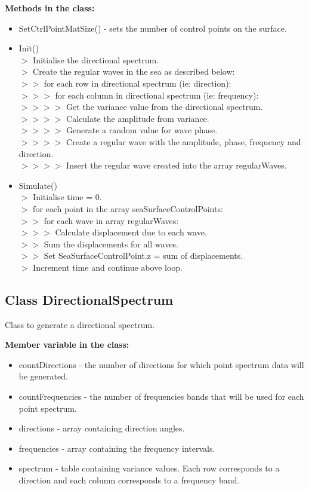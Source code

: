 \textbf{Methods in the class:}
\begin{itemize}
  \item SetCtrlPointMatSize() - sets the number of control points on the
    surface.
  \item Init()\\
    $>$ Initialise the directional spectrum.\\
    $>$ Create the regular waves in the sea as described below:\\
    $>>$ for each row in directional spectrum (ie: direction):\\
    $>>>$ for each column in directional spectrum (ie: frequency):\\
  	$>>>>$ Get the variance value from the directional spectrum.\\
  	$>>>>$ Calculate the amplitude from variance.\\
    $>>>>$ Generate a random value for wave phase.\\
    $>>>>$ Create a regular wave with the amplitude, phase, frequency and 
          direction.\\
    $>>>>$ Insert the regular wave created into the array regularWaves.
  \item Simulate() \\
    $>$ Initialise time = 0.\\ 
  	$>$ for each point in the array seaSurfaceControlPoints:\\
  	$>>$ for each wave in array regularWaves:\\
  	$>>>$ Calculate displacement due to each wave.\\
    $>>$ Sum the displacements for all waves.\\
    $>>$ Set SeaSurfaceControlPoint.z = sum of displacements.\\
  	$>$ Increment time and continue above loop.
\end{itemize}

\subsection{Class DirectionalSpectrum} \label{Class DirectionalSpectrum}
Class to generate a directional spectrum.

\textbf{Member variable in the class:} 
\begin{itemize} 
  \item countDirections - the number of directions for which point spectrum data 
    will be generated.  
  \item countFrequencies - the number of frequencies bands that will be used for 
    each point spectrum.  
  \item directions - array containing direction angles.
  \item frequencies - array containing the frequency intervals.
  \item spectrum - table containing variance values. Each row corresponds to 
    a direction and each column corresponds to a frequency band.  
\end{itemize}

